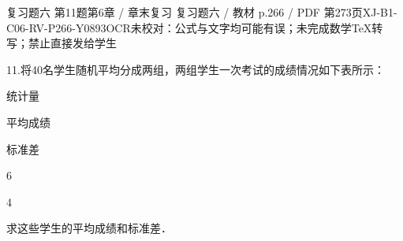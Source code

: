 \begin{bankitem}{复习题六 第11题}{第6章 / 章末复习 复习题六 / 教材 p.266 / PDF 第273页}{XJ-B1-C06-RV-P266-Y0893}{OCR未校对：公式与文字均可能有误；未完成数学TeX转写；禁止直接发给学生}
\begin{ocrdraft}
\par
11.将40名学生随机平均分成两组，两组学生一次考试的成绩情况如下表所示：
\par
统计量
\par
平均成绩
\par
标准差
\par
6
\par
4
\par
求这些学生的平均成绩和标准差．
\end{ocrdraft}
\end{bankitem}

